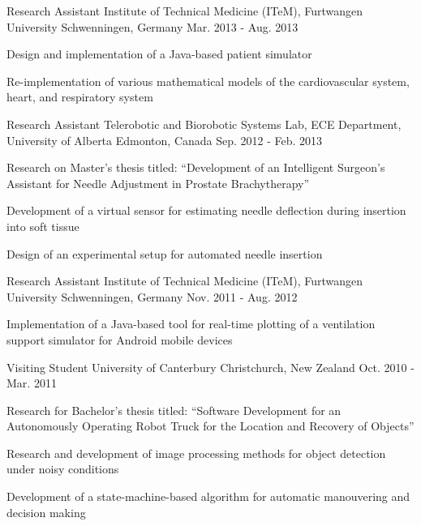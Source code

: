 \begin{cventries}
    \cventry
      {Research Assistant} %
      {Institute of Technical Medicine (ITeM), Furtwangen University} %
      {Schwenningen, Germany} %
      {Mar. 2013 - Aug. 2013} %
      {
        \begin{cvitems}
          \item {Design and implementation of a Java-based patient simulator}
          \item {Re-implementation of various mathematical models of the cardiovascular system, heart, and respiratory system}
        \end{cvitems}
      }

    \cventry
      {Research Assistant} %
      {Telerobotic and Biorobotic Systems Lab, ECE Department, University of Alberta} %
      {Edmonton, Canada} %
      {Sep. 2012 - Feb. 2013} %
      {
        \begin{cvitems}
          \item {Research on Master's thesis titled: ``Development of an Intelligent Surgeon's Assistant for Needle Adjustment in Prostate Brachytherapy''}
          \item {Development of a virtual sensor for estimating needle deflection during insertion into soft tissue}
          \item {Design of an experimental setup for automated needle insertion}
        \end{cvitems}
      }

    \cventry
      {Research Assistant} %
      {Institute of Technical Medicine (ITeM), Furtwangen University} %
      {Schwenningen, Germany} %
      {Nov. 2011 - Aug. 2012} %
      {
        \begin{cvitems}
          \item {Implementation of a Java-based tool for real-time plotting of a ventilation support simulator for Android mobile devices}
        \end{cvitems}
      }

  \cventry
    {Visiting Student} %
    {University of Canterbury} %
    {Christchurch, New Zealand} %
    {Oct. 2010 - Mar. 2011} %
    {
      \begin{cvitems}
        \item {Research for Bachelor's thesis titled:} ``Software Development for an Autonomously Operating Robot Truck for the Location and Recovery of Objects''
        \item {Research and development of image processing methods for object detection under noisy conditions}
        \item {Development of a state-machine-based algorithm for automatic manouvering and decision making}
      \end{cvitems}
    }


\end{cventries}
